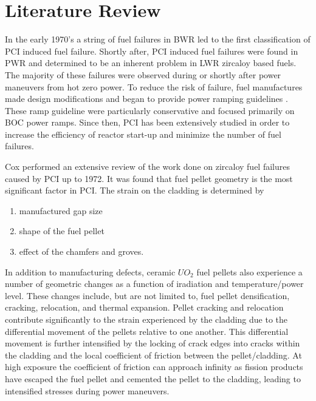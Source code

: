 \documentclass[edeposit,fullpage,11pt]{uiucthesis2009}
\begin{document}
\section{Literature Review}

In the early 1970's a string of fuel failures in \gls{BWR} led to the first classification of \gls{PCI} induced fuel failure.  
Shortly after, \gls{PCI} induced fuel failures were found in \gls{PWR} and determined to be an inherent problem in \gls{LWR} zircaloy based fuels. %
The majority of these failures were observed during or shortly after power maneuvers from hot zero power.
To reduce the risk of failure, fuel manufactures made design modifications and began to provide power ramping guidelines \cite{kennard_pci_2016}.
These ramp guideline were particularly conservative and focused primarily on \gls{BOC} power ramps. 
Since then, \gls{PCI} has been extensively studied in order to increase the efficiency of reactor start-up and minimize the number of fuel failures.
 
Cox \cite{cox_pellet-clad_1990} performed an extensive review of the work done on zircaloy fuel failures caused by \gls{PCI} up to 1972.
It was found that fuel pellet geometry is the most significant factor in \gls{PCI}.
The strain on the cladding is determined by
\begin{enumerate}
\item manufactured gap size
\item shape of the fuel pellet
\item effect of the chamfers and groves.
\end{enumerate} 
In addition to manufacturing defects, ceramic $UO_2$ fuel pellets also experience a number of geometric changes as a function of iradiation and temperature/power level.
These changes include, but are not limited to, fuel pellet  densification, cracking, relocation, and thermal expansion. 
Pellet cracking and relocation contribute significantly to the strain experienced by the cladding due to the differential movement of the pellets relative to one another.
This differential movement is further intensified  by the locking of crack edges into cracks within the cladding and the local coefficient of friction between the pellet/cladding.
At high exposure the coefficient of friction can approach infinity as fission products have escaped the fuel pellet and cemented the pellet to the cladding, leading to intensified stresses during power maneuvers. 
\end{document}
